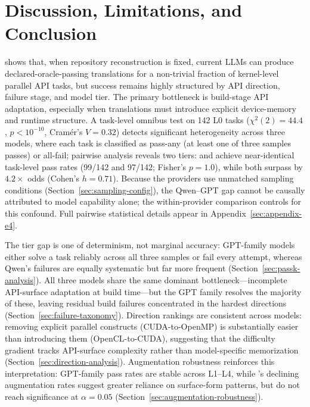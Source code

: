 \section{Discussion, Limitations, and Conclusion}
\label{sec:discussion}

\parbench{} shows that, when repository reconstruction is fixed, current LLMs can produce declared-oracle-passing translations for a non-trivial fraction of kernel-level parallel API tasks, but success remains highly structured by API direction, failure stage, and model tier. The primary bottleneck is build-stage API adaptation, especially when translations must introduce explicit device-memory and runtime structure. A task-level omnibus test on 142 L0 tasks ($\chi^2(2) = 44.4$, $p < 10^{-10}$, Cram\'er's $V = 0.32$) detects significant heterogeneity across three models, where each task is classified as pass-any (at least one of three samples passes) or all-fail; pairwise analysis reveals two tiers: \gptnew{} and \codex{} achieve near-identical task-level pass rates (99/142 and 97/142; Fisher's $p = 1.0$), while both surpass \qwenshort{} by $4.2\times$ odds (Cohen's $h = 0.71$). Because the providers use unmatched sampling conditions (Section~\ref{sec:sampling-config}), the Qwen--GPT gap cannot be causally attributed to model capability alone; the within-provider comparison controls for this confound. Full pairwise statistical details appear in Appendix~\ref{sec:appendix-e4}.

The tier gap is one of determinism, not marginal accuracy: GPT-family models either solve a task reliably across all three samples or fail every attempt, whereas Qwen's failures are equally systematic but far more frequent (Section~\ref{sec:passk-analysis}). All three models share the same dominant bottleneck---incomplete API-surface adaptation at build time---but the GPT family resolves the majority of these, leaving residual build failures concentrated in the hardest directions (Section~\ref{sec:failure-taxonomy}). Direction rankings are consistent across models: removing explicit parallel constructs (CUDA-to-OpenMP) is substantially easier than introducing them (OpenCL-to-CUDA), suggesting that the difficulty gradient tracks API-surface complexity rather than model-specific memorization (Section~\ref{sec:direction-analysis}). Augmentation robustness reinforces this interpretation: GPT-family pass rates are stable across L1--L4, while \qwenshort{}'s declining augmentation rates suggest greater reliance on surface-form patterns, but do not reach significance at $\alpha = 0.05$ (Section~\ref{sec:augmentation-robustness}).

